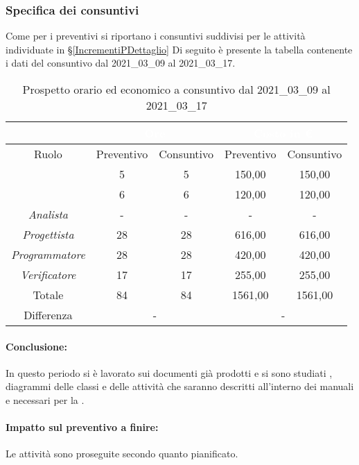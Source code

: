 \subsubsection{Specifica dei consuntivi}
Come per i preventivi si riportano i consuntivi suddivisi per le attività individuate in \S\ref{IncrementiPDettaglio}
Di seguito è presente la tabella contenente i dati del consuntivo dal 2021\_03\_09 al 2021\_03\_17.
\begin{table}[H]
	\centering
	\begin{tabular}{|c|c|c|c|c|}
		\rowcolor{darkblue} 
		&\multicolumn{2}{c|}{\textcolor{white}{Ore}}&\multicolumn{2}{c|}{\textcolor{white}{Costo in €}}\\ \hline
		Ruolo				&	Preventivo			&	Consuntivo		&	Preventivo	&	Consuntivo\\ \hline
		{\Responsabile}		&	5					&	5				&	150,00		&	150,00 \\ \hline
		{\Amministratore}	&	6					&	6				&	120,00		&	120,00 \\ \hline
		\textit{Analista}	&	-					&	-				&	-			&	- \\ \hline
		\textit{Progettista}& 	28					&   28 				& 	616,00		&  	616,00 \\ \hline
		\textit{Programmatore}& 28					& 	28				& 	420,00		&  	420,00 \\ \hline
		\textit{Verificatore}&	17					&	17				&	255,00		&	255,00\\ \hline
		Totale				&	84					&	84				&	1561,00		&	1561,00 \\ \hline
		Differenza			& 	\multicolumn{2}{c|}{-} 			    &\multicolumn{2}{c|}{-}\\ \hline
	\end{tabular}
	\caption{Prospetto orario ed economico a consuntivo dal 2021\_03\_09 al 2021\_03\_17}
\end{table}
\paragraph*{Conclusione:}
In questo periodo si è lavorato sui documenti già prodotti e si sono studiati , diagrammi delle classi e delle attività che saranno descritti all'interno dei manuali e necessari per la .
\paragraph*{Impatto sul preventivo a finire:}
Le attività sono proseguite secondo quanto pianificato.

